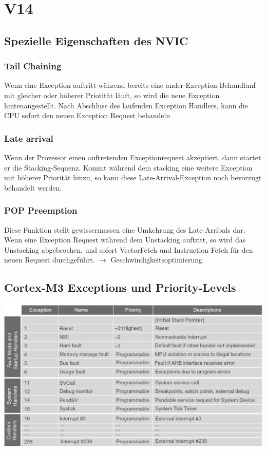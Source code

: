 \section{V14}
\subsection{Spezielle Eigenschaften des NVIC}\label{NVIC}
\subsubsection{Tail Chaining}
Wenn eine Exception auftritt während bereits eine ander Exception-Behandlunf mit gleicher oder höherer Priotität läuft, so wird die neue Exception hintenangestellt. Nach Abschluss des laufenden Exception Handlers, kann die CPU sofort den neuen Exception Request behandeln

\subsubsection{Late arrival}
Wenn der Prozessor einen auftretenden Exceptionrequest akzeptiert, dann startet er die Stacking-Sequenz. Kommt während dem stacking eine weitere Exception mit höherer Priorität hinzu, so kann diese Late-Arrival-Exception noch bevorzugt behandelt werden.

\subsubsection{POP Preemption}
Diese Funktion stellt gewissermassen eine Umkehrung des Late-Arribals dar. Wenn eine Exception Request während dem Unstacking auftritt, so wird das Unstacking abgebrochen, und sofort VectorFetch und Instruction Fetch für den neuen Request durchgeführt. $\rightarrow$ Geschwindigkeitsoptimierung\\

\subsection{Cortex-M3 Exceptions und Priority-Levels}
\includegraphics[width=1\linewidth]{images/NVICExcp1} 